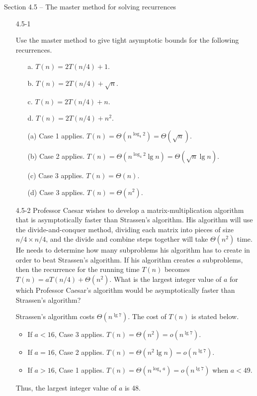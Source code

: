 \newpage

{\large Section 4.5 {--} The master method for solving recurrences}

\begin{enumerate}

\item[4.5{-}1]{Use the master method to give tight asymptotic bounds for the
following recurrences.

\begin{enumerate}
  \item[a.] $T(n) = 2T(n/4) + 1$.
  \item[b.] $T(n) = 2T(n/4) + \sqrt{n}$.
  \item[c.] $T(n) = 2T(n/4) + n$.
  \item[d.] $T(n) = 2T(n/4) + n^2$.
\end{enumerate}
}

\begin{framed}
\begin{enumerate}
  \item[(a)] Case 1 applies. $T(n) = \Theta(n^{\log_4{2}}) = \Theta(\sqrt{n})$.
  \item[(b)] Case 2 applies. $T(n) = \Theta(n^{\log_4{2}} \lg n) = \Theta(\sqrt{n} \lg n)$.
  \item[(c)] Case 3 applies. $T(n) = \Theta(n)$.
  \item[(d)] Case 3 applies. $T(n) = \Theta(n^2)$.
\end{enumerate}
\end{framed}

\item[4.5{-}2]{Professor Caesar wishes to develop a matrix-multiplication
algorithm that is asymptotically faster than Strassen's algorithm. His algorithm
will use the divide-and-conquer method, dividing each matrix into pieces of
size $n/4 \times n/4$, and the divide and combine steps together will take
$\Theta(n^2)$ time. He needs to determine how many subproblems his algorithm has
to create in order to beat Strassen's algorithm. If his algorithm creates $a$
subproblems, then the recurrence for the running time $T(n)$ becomes
$T(n) = a T(n/4) + \Theta(n^2)$. What is the largest integer value of $a$ for
which Professor Caesar's algorithm would be asymptotically faster than
Strassen's algorithm?}

\begin{framed}
Strassen's algorithm costs $\Theta(n^{\lg 7})$. The cost of $T(n)$ is stated
below.
\begin{itemize}
  \item If $a < 16$, Case 3 applies. $T(n) = \Theta(n^2) = o(n^{\lg 7})$.
  \item If $a = 16$, Case 2 applies. $T(n) = \Theta(n^2 \lg n) = o(n^{\lg 7})$.
  \item If $a > 16$, Case 1 applies. $T(n) = \Theta(n^{\log_4{a}}) = o(n^{\lg 7})$ when $a < 49$.
\end{itemize}
Thus, the largest integer value of $a$ is 48.
\end{framed}


\end{enumerate}
